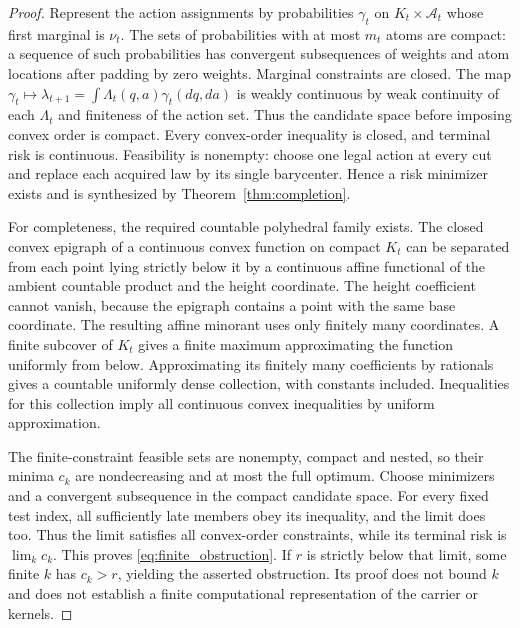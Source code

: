 \begin{proof}
Represent the action assignments by probabilities $\gamma_t$ on $K_t\times\mathcal A_t$ whose first marginal is $\nu_t$. The sets of probabilities with at most $m_t$ atoms are compact: a sequence of such probabilities has convergent subsequences of weights and atom locations after padding by zero weights. Marginal constraints are closed. The map
$\gamma_t\mapsto\lambda_{t+1}=\int\Lambda_t(q,a)\gamma_t(dq,da)$
is weakly continuous by weak continuity of each $\Lambda_t$ and finiteness of the action set. Thus the candidate space before imposing convex order is compact. Every convex-order inequality is closed, and terminal risk is continuous. Feasibility is nonempty: choose one legal action at every cut and replace each acquired law by its single barycenter. Hence a risk minimizer exists and is synthesized by Theorem~\ref{thm:completion}.

For completeness, the required countable polyhedral family exists. The closed convex epigraph of a continuous convex function on compact $K_t$ can be separated from each point lying strictly below it by a continuous affine functional of the ambient countable product and the height coordinate. The height coefficient cannot vanish, because the epigraph contains a point with the same base coordinate. The resulting affine minorant uses only finitely many coordinates. A finite subcover of $K_t$ gives a finite maximum approximating the function uniformly from below. Approximating its finitely many coefficients by rationals gives a countable uniformly dense collection, with constants included. Inequalities for this collection imply all continuous convex inequalities by uniform approximation.

The finite-constraint feasible sets are nonempty, compact and nested, so their minima $c_k$ are nondecreasing and at most the full optimum. Choose minimizers and a convergent subsequence in the compact candidate space. For every fixed test index, all sufficiently late members obey its inequality, and the limit does too. Thus the limit satisfies all convex-order constraints, while its terminal risk is $\lim_kc_k$. This proves \eqref{eq:finite_obstruction}. If $r$ is strictly below that limit, some finite $k$ has $c_k>r$, yielding the asserted obstruction. Its proof does not bound $k$ and does not establish a finite computational representation of the carrier or kernels.
\end{proof}
